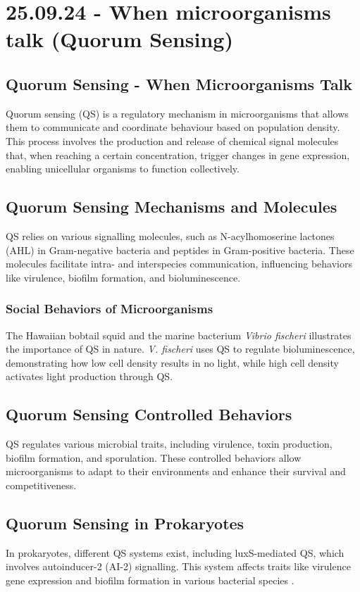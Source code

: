\section{25.09.24 - When microorganisms talk (Quorum Sensing)}
\subsection{Quorum Sensing - When Microorganisms Talk} 
Quorum sensing (QS) is a regulatory mechanism in microorganisms that allows them to communicate and coordinate behaviour based on population density. This process involves the production and release of chemical signal molecules that, when reaching a certain concentration, trigger changes in gene expression, enabling unicellular organisms to function collectively.

\subsection{Quorum Sensing Mechanisms and Molecules} 
QS relies on various signalling molecules, such as N-acylhomoserine lactones (AHL) in Gram-negative bacteria and peptides in Gram-positive bacteria. These molecules facilitate intra- and interspecies communication, influencing behaviors like virulence, biofilm formation, and bioluminescence.

\subsubsection{Social Behaviors of Microorganisms} 
The Hawaiian bobtail squid and the marine bacterium \textit{Vibrio fischeri} illustrates the importance of QS in nature. \textit{V. fischeri} uses QS to regulate bioluminescence, demonstrating how low cell density results in no light, while high cell density activates light production through QS.

\subsection{Quorum Sensing Controlled Behaviors} 
QS regulates various microbial traits, including virulence, toxin production, biofilm formation, and sporulation. These controlled behaviors allow microorganisms to adapt to their environments and enhance their survival and competitiveness.

\subsection{Quorum Sensing in Prokaryotes} 
In prokaryotes, different QS systems exist, including luxS-mediated QS, which involves autoinducer-2 (AI-2) signalling. This system affects traits like virulence gene expression and biofilm formation in various bacterial species \cite*{L8-ImpQuorum}.

